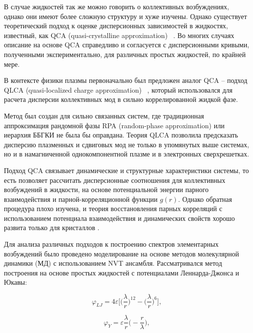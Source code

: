 В случае жидкостей так же можно говорить о коллективных возбуждениях,
однако они имеют более сложную структуру и хуже изучены. Однако
существует теоретический подход к оценке дисперсионных зависимостей в жидкостях,
известный, как QCA (quasi-crystalline approximation) ~\cite{Khrapak:2018aa}. Во многих
случаях описание на основе QCA справедливо и согласуется с дисперсионными
кривыми, полученными экспериментально, для различных простых жидкостей,
по крайней мере.


В контексте физики плазмы первоначально был предложен аналог QCA -- подход QLCA (quasi-localized charge approximation) ~\cite{doi:10.1063/1.873814}, который использовался для расчета дисперсии  коллективных мод в  сильно коррелированной жидкой фазе.

Метод был создан для сильно связанных систем, где традиционная аппроксимация рандомной фазы RPA (random-phase approximation) или иерархия ББГКИ не была бы оправдана. Теория QLCA позволила предсказать дисперсию плазменных и сдвиговых мод не только в упомянутых выше системах, но и в намагниченной однокомпонентной плазме и в электронных сверхрешетках.

Подход QCA связывает динамические и структурные характеристики системы,
то есть позволяет рассчитать дисперсионные соотношения для коллективных
возбуждений в жидкости, на основе потенциальной энергии парного взаимодействия
и парной-корреляционной функции $g(r)$.
Однако обратная процедура плохо изучена, и теория восстановления парных
корреляций с использованием потенциала взаимодействия и динамических свойств
хорошо развита только для кристаллов \cite{10.1039/C7SM02429K, Khrapak:Practicalth, Yurchenko2016IM}.

Для анализа различных подходов к построению спектров элементарных возбуждений было проведено моделирование на основе методов молекулярной динамики (МД) с использованием NVT ансамбля.
Рассматривался метод построения на основе простых жидкостей с потенциалами Леннарда-Джонса и Юкавы:

\begin{equation}
\varphi_{LJ} = 4 \varepsilon \Big[\Big(\frac{\lambda}{r} \Big)^{12} - \Big(\frac{\lambda}{r} \Big)^6\Big],
\end{equation}

\begin{equation}
\varphi_{Y} = \varepsilon \frac{\lambda}{r} \Big(-\frac{r}{\lambda} \Big),
\label{Yukawa}
\end{equation}



